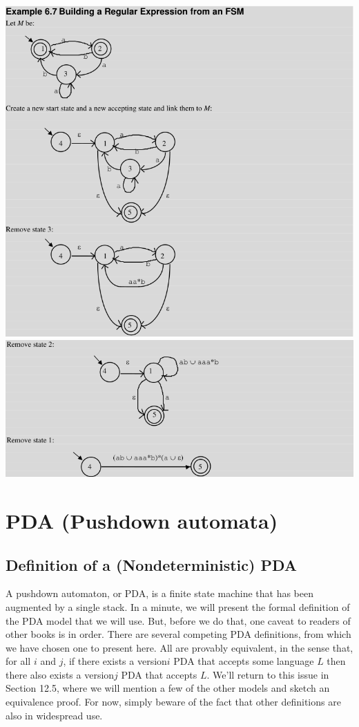 \documentclass{article}
\begin{document}
\includegraphics[width=\textwidth]{img/fsmtoregex1.png}
\includegraphics[width=\textwidth]{img/fsmtoregex2.png}

\section{PDA (Pushdown automata)}

\subsection{Definition of a (Nondeterministic) PDA }

A pushdown automaton, or PDA, is a finite state machine that has been augmented
by a single stack. In a minute, we will present the formal definition of the
PDA model that we will use. But, before we do that, one caveat to readers of
other books is in order. There are several competing PDA definitions, from
which we have chosen one to present here. All are provably equivalent, in the
sense that, for all $i$ and $j$, if there exists a version$i$ PDA that accepts
some language $L$ then there also exists a version$j$ PDA that accepts $L$.
We’ll return to this issue in Section 12.5, where we will mention a few of the
other models and sketch an equivalence proof. For now, simply beware of the
fact that other definitions are also in widespread use.
\end{document}
